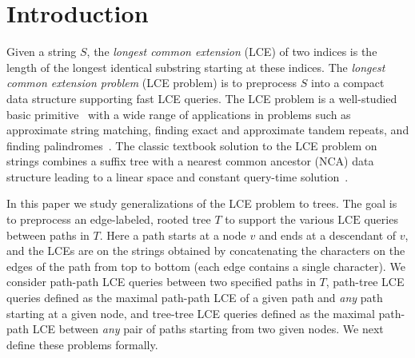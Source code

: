 \documentclass [10pt]{article}
\newcommand{\LCE}{\ensuremath{\mathrm{LCE}}}
\begin{document}
\section{Introduction}
Given a string $S$, the \emph{longest common extension} (LCE) of two indices is the length of the longest identical substring starting at these indices. The \emph{longest common extension problem} (LCE problem) is to preprocess $S$ into a compact data structure supporting fast LCE queries. The LCE problem is a well-studied basic primitive~\cite{BGK2012,INL2010,BGSV2014, BGKLV2015, FH2006} with a wide range of applications in problems  such as approximate string matching, finding exact and approximate tandem repeats, and  finding palindromes~\cite{ALP2004,CH2002, LV1989, Myers1986,GS2004,LSS2001, LMS1998, ML1984}. The classic textbook solution to the LCE problem on strings combines a suffix tree with a nearest common ancestor (NCA) data structure leading to a linear space and constant query-time solution~\cite{Gusfield1997}. 


In this paper we study generalizations of the LCE problem to trees. The goal is to preprocess an edge-labeled, rooted tree $T$ to support the various $\LCE$ queries between paths in $T$. Here a path starts at a node $v$ and ends at a descendant of $v$, and the LCEs are on the strings obtained by concatenating the characters on the edges of the path from top to bottom (each edge contains a single character). We consider path-path LCE queries between two specified paths in $T$, path-tree LCE queries defined as the maximal path-path LCE of a given path and \emph{any} path starting at a given node, and tree-tree LCE queries defined as the maximal path-path LCE between \emph{any} pair of paths starting from two given nodes.   We next define these problems formally. 
\end{document}
